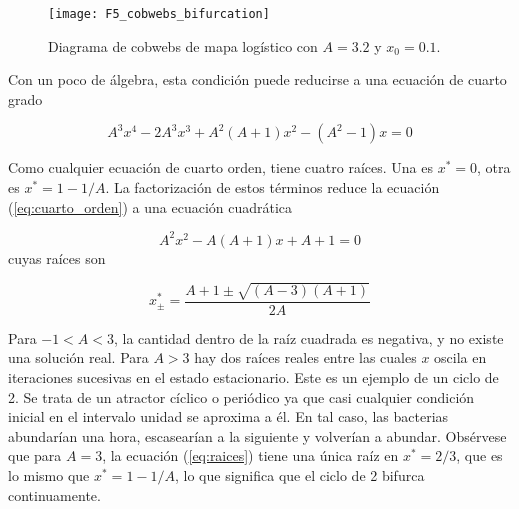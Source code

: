 \begin{itemize}
                    \begin{figure}[hbtp]
                        \caption{Diagrama de cobwebs de mapa logístico con $A = 3.2$ y $x_{0} = 0.1$.}
                        \centering
                        \texttt{[image: F5\_cobwebs\_bifurcation]}
                        \label{fig:F5_cobwebs_bifurcation}
                    \end{figure}

                    Con un poco de álgebra, esta condición puede reducirse a una ecuación de cuarto grado

                    \begin{equation}
                        A^{3} x^{4} - 2 A^{3} x^{3} + A^{2} (A + 1) x^{2} - (A^{2} -1)x = 0
                        \label{eq:cuarto_orden}
                    \end{equation}

                    Como cualquier ecuación de cuarto orden, tiene cuatro raíces. Una es $x^{*} = 0$, otra es $x^{*} = 1 - 1/A$. La factorización de estos términos reduce la ecuación (\ref{eq:cuarto_orden}) a una ecuación cuadrática

                    \begin{equation}
                        A^{2} x^{2} - A (A + 1) x + A + 1 = 0
                        \label{eq:segundo_orden}
                    \end{equation}
                    cuyas raíces son

                    \begin{equation}
                        x_{\pm}^{*} = \frac{A + 1 \pm \sqrt{(A-3) (A + 1)} }{2A} 
                        \label{eq:raices}
                    \end{equation}

                    Para $-1 < A < 3$, la cantidad dentro de la raíz cuadrada es negativa, y no existe una solución real. Para $A > 3$ hay dos raíces reales entre las cuales $x$ oscila en iteraciones sucesivas en el estado estacionario. Este es un ejemplo de un ciclo de 2. Se trata de un atractor cíclico o periódico ya que casi cualquier condición inicial en el intervalo unidad se aproxima a él. En tal caso, las bacterias abundarían una hora, escasearían a la siguiente y volverían a abundar. Obsérvese que para $A = 3$, la ecuación (\ref{eq:raices}) tiene una única raíz en $x^{*} = 2/3$, que es lo mismo que $x^{*} = 1 - 1/A$, lo que significa que el ciclo de 2 bifurca continuamente. 


\end{itemize}
